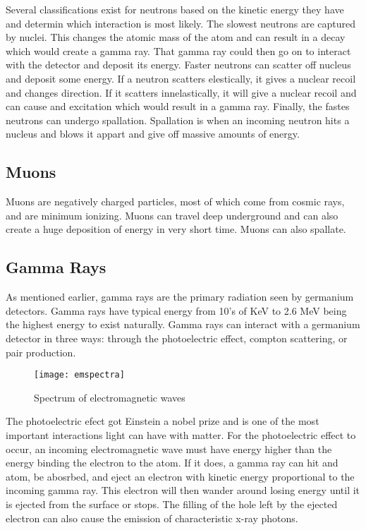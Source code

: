 Several classifications exist for neutrons based on the kinetic energy they have and determin which interaction is most likely.
The slowest neutrons are captured by nuclei.
This changes the atomic mass of the atom and can result in a decay which would create a gamma ray.
That gamma ray could then go on to interact with the detector and deposit its energy.
Faster neutrons can scatter off nucleus and deposit some energy.
If a neutron scatters elestically, it gives a nuclear recoil and changes direction.
If it scatters innelastically, it will give a nuclear recoil and can cause and excitation which would result in a gamma ray.
Finally, the fastes neutrons can undergo spallation.
Spallation is when an incoming neutron hits a nucleus and blows it appart and give off massive amounts of energy.

\subsection{Muons}
Muons are negatively charged particles, most of which come from cosmic rays, and are minimum ionizing. 
Muons can travel deep underground and can also create a huge deposition of energy in very short time.
Muons can also spallate.

\subsection{Gamma Rays}
As mentioned earlier, gamma rays are the primary radiation seen by germanium detectors.
Gamma rays have typical energy from 10's of KeV to 2.6 MeV being the highest energy to exist naturally.
Gamma rays can interact with a germanium detector in three ways: through the photoelectric effect, compton scattering, or pair production.
\begin{figure}[htpb]
\centering
\texttt{[image: emspectra]}
\caption{Spectrum of electromagnetic waves}
\label{fig:emspectra}
\end{figure}

The photoelectric efect got Einstein a nobel prize and is one of the most important interactions light can have with matter.
For the photoelectric effect to occur, an incoming electromagnetic wave must have energy higher than the energy binding the electron to the atom.
If it does, a gamma ray can hit and atom, be abosrbed, and eject an electron with kinetic energy proportional to the incoming gamma ray.
This electron will then wander around losing energy until it is ejected from the surface or stops.
The filling of the hole left by the ejected electron can also cause the emission of characteristic x-ray photons.

